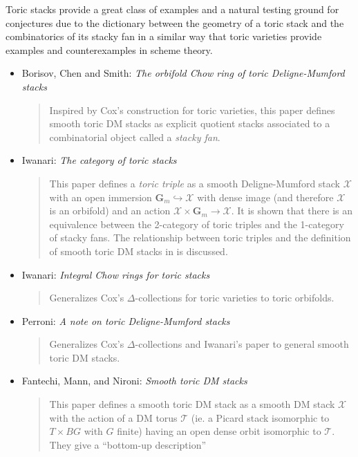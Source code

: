 \noindent
Toric stacks provide a great class of examples and a natural testing ground
for conjectures due to the dictionary between the geometry of a toric stack
and the combinatorics of its stacky fan in a similar way that toric varieties
provide examples and counterexamples in scheme theory.
\begin{itemize}
\item Borisov, Chen and Smith: \emph{The orbifold Chow ring of toric
Deligne-Mumford stacks} \cite{bcs}
\begin{quote}
Inspired by Cox's construction for toric varieties, this paper defines
smooth toric DM stacks as explicit quotient stacks associated to a
combinatorial object called a \emph{stacky fan}.
\end{quote}
\item Iwanari: \emph{The category of toric stacks} \cite{iwanari_toric}
\begin{quote}
This paper defines a \emph{toric triple} as a smooth Deligne-Mumford stack
$\mathcal{X}$ with an open immersion $\mathbf{G}_m \hookrightarrow \mathcal{X}$
with dense image (and therefore $\mathcal{X}$ is an orbifold) and an action
$\mathcal{X} \times \mathbf{G}_m \rightarrow \mathcal{X}$. It is shown that
there is an equivalence between the 2-category of toric triples and the
1-category of stacky fans. The relationship between toric triples and the
definition of smooth toric DM stacks in \cite{bcs} is discussed.
\end{quote}
\item Iwanari: \emph{Integral Chow rings for toric stacks}
\cite{iwanari_chow}
\begin{quote}
Generalizes Cox's $\Delta$-collections for toric varieties to toric orbifolds.
\end{quote}
\item Perroni: \emph{A note on toric Deligne-Mumford stacks}
\cite{perroni}
\begin{quote}
Generalizes Cox's $\Delta$-collections and Iwanari's paper
\cite{iwanari_chow} to general smooth toric DM stacks.
\end{quote}
\item Fantechi, Mann, and Nironi: \emph{Smooth toric DM stacks}
\cite{fmn}
\begin{quote}
This paper defines a smooth toric DM stack as a smooth DM stack
$\mathcal{X}$ with the action of a DM torus $\mathcal{T}$ (ie. a Picard
stack isomorphic to $T \times BG$ with $G$ finite) having an open dense
orbit isomorphic to $\mathcal{T}$. They give a ``bottom-up description''

\end{quote}
\end{itemize}
